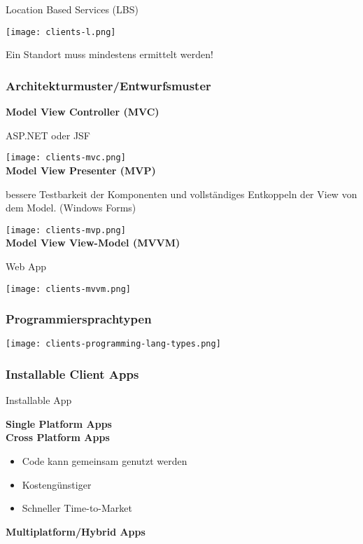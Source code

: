 Location Based Services (LBS)

\texttt{[image: clients-l.png]}

Ein Standort muss mindestens ermittelt werden!

\subsubsection{Architekturmuster/Entwurfsmuster}

\textbf{Model View Controller (MVC)}

ASP.NET oder JSF

\texttt{[image: clients-mvc.png]} \\


\textbf{Model View Presenter (MVP)}

bessere Testbarkeit der Komponenten und vollständiges Entkoppeln der View von dem Model. (Windows Forms)

\texttt{[image: clients-mvp.png]} \\

\textbf{Model View View-Model (MVVM)}

Web App

\texttt{[image: clients-mvvm.png]} \\

\subsubsection{Programmiersprachtypen}

\texttt{[image: clients-programming-lang-types.png]} \\

\subsubsection{Installable Client Apps}

Installable App

\textbf{Single Platform Apps} \\


\textbf{Cross Platform Apps}

\begin{itemize}
    \item Code kann gemeinsam genutzt werden
    \item Kostengünstiger
    \item Schneller Time-to-Market
\end{itemize}
\vspace{10pt}
\textbf{Multiplatform/Hybrid Apps}

